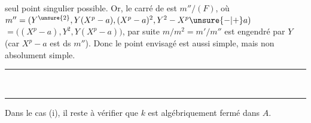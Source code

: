 seul point singulier possible. Or, le carré de  est $m''/(F)$,  où $m''=(Y^{\unsure{2}},Y(X^p-a),(X^p-a)^2,Y^2-X^p\unsure{-|+}a)$  $=\bigl((X^p-a),Y^2,Y(X^p-a)\bigr)$, par suite $m/m^2=m'/m''$ est engendré par $Y$ (car $X^p-a$ est ds $m''$). Donc le point envisagé est aussi simple, mais non absolument simple.

\begin{center}\rule{.22\linewidth}{.3pt}\\[-.8ex]\rule{.19\linewidth}{.3pt}\end{center}

Dans le cas (i), il reste à vérifier que $k$ est algébriquement fermé dans $A$.



